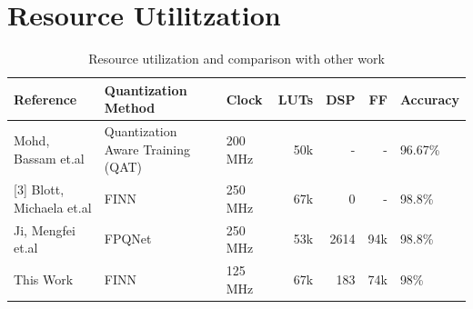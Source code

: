 \section{Resource Utilitzation}

\begin{table}[h]
    \centering
    \begin{tabularx}{1.1\textwidth}{|X|X|X|r|r|r|X|}
        \hline
        \textbf{Reference} & \textbf{Quantization Method} & \textbf{Clock}  & \textbf{LUTs} & \textbf{DSP} & \textbf{FF} & \textbf{Accuracy} \\
        \hline
        [2]Mohd, Bassam et.al & Quantization Aware Training (QAT) &200 MHz  & 50k  & -  & - & 96.67\% \\\hline
        
        [3] Blott, Michaela et.al & FINN &250 MHz  & 67k  & 0  & - & 98.8\% \\\hline
        [4] Ji, Mengfei et.al & FPQNet &250 MHz  & 53k  & 2614  & 94k & 98.8\% \\\hline
        This Work & FINN &125 MHz  & 67k  & 183  & 74k & 98\% \\\hline

   
    \end{tabularx}
    \caption{Resource utilization and comparison with other work}
    \label{tab:PTQ_comparison}
\end{table}



 
% 





